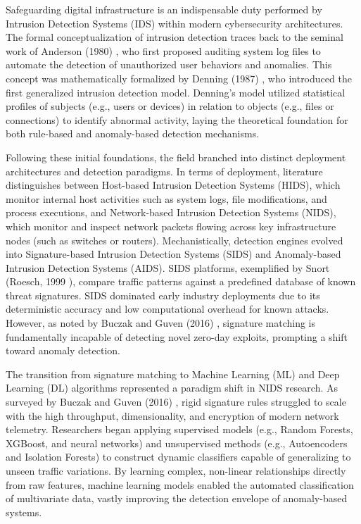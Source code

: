 \documentclass[12pt,a4paper]{report}
\begin{document}
Safeguarding digital infrastructure is an indispensable duty performed by Intrusion Detection Systems (IDS) within modern cybersecurity architectures. The formal conceptualization of intrusion detection traces back to the seminal work of Anderson (1980) \cite{anderson1980}, who first proposed auditing system log files to automate the detection of unauthorized user behaviors and anomalies. This concept was mathematically formalized by Denning (1987) \cite{denning1987}, who introduced the first generalized intrusion detection model. Denning's model utilized statistical profiles of subjects (e.g., users or devices) in relation to objects (e.g., files or connections) to identify abnormal activity, laying the theoretical foundation for both rule-based and anomaly-based detection mechanisms.

Following these initial foundations, the field branched into distinct deployment architectures and detection paradigms. In terms of deployment, literature distinguishes between Host-based Intrusion Detection Systems (HIDS), which monitor internal host activities such as system logs, file modifications, and process executions, and Network-based Intrusion Detection Systems (NIDS), which monitor and inspect network packets flowing across key infrastructure nodes (such as switches or routers). Mechanistically, detection engines evolved into Signature-based Intrusion Detection Systems (SIDS) and Anomaly-based Intrusion Detection Systems (AIDS). SIDS platforms, exemplified by Snort (Roesch, 1999 \cite{roesch1999}), compare traffic patterns against a predefined database of known threat signatures. SIDS dominated early industry deployments due to its deterministic accuracy and low computational overhead for known attacks. However, as noted by Buczak and Guven (2016) \cite{buczak2016}, signature matching is fundamentally incapable of detecting novel zero-day exploits, prompting a shift toward anomaly detection.

The transition from signature matching to Machine Learning (ML) and Deep Learning (DL) algorithms represented a paradigm shift in NIDS research. As surveyed by Buczak and Guven (2016) \cite{buczak2016}, rigid signature rules struggled to scale with the high throughput, dimensionality, and encryption of modern network telemetry. Researchers began applying supervised models (e.g., Random Forests, XGBoost, and neural networks) and unsupervised methods (e.g., Autoencoders and Isolation Forests) to construct dynamic classifiers capable of generalizing to unseen traffic variations. By learning complex, non-linear relationships directly from raw features, machine learning models enabled the automated classification of multivariate data, vastly improving the detection envelope of anomaly-based systems.
\end{document}
